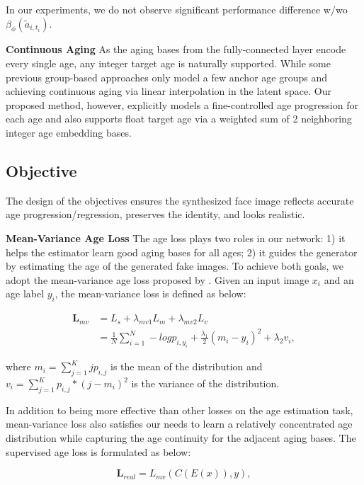 \documentclass[final]{cvpr}
\begin{document}
In our experiments, we do not observe significant performance difference w/wo \(\beta_\phi(\tilde{a}_{i,t_i})\).

\textbf{Continuous Aging}
As the aging bases from the fully-connected layer encode every single age, any integer target age is naturally supported. While some previous group-based approaches only model a few anchor age groups and achieving continuous aging via linear interpolation in the latent space. Our proposed method, however, explicitly models a fine-controlled age progression for each age and also supports float target age via a weighted sum of 2
neighboring integer age embedding bases.

\subsection{Objective}
The design of the objectives ensures the synthesized face image reflects accurate age progression/regression, preserves the identity, and looks realistic.

\textbf{Mean-Variance Age Loss}
The age loss plays two roles in our network: 1) it helps the estimator learn good aging bases for all ages; 2) it guides the generator by estimating the age of the generated fake images. To achieve both goals, we adopt the mean-variance age loss proposed by \cite{pan2018mean}. Given an input image \(x_i\) and an age label \(y_i\), the mean-variance loss is defined as below:

\begin{equation}
\begin{split}
\mathbf{L}_{mv} &= L_s + \lambda_{mv1} L_m + \lambda_{mv2} L_v \\ 
                                &= \frac{1}{N} \sum_{i=1}^{N} -log p_{i, y_i} + \frac{\lambda_1}{2} (m_i - y_i)^2 + \lambda_2 v_i,
\label{mean_variance_loss}
\end{split}
\end{equation}

where \(m_i = \sum_{j=1}^{K} jp_{i,j}\) is the mean of the distribution and \(v_i = \sum_{j=1}^{K} p_{i,j} * (j - m_i)^2\) is the variance of the distribution.


In addition to being more effective than other losses on the age estimation task, mean-variance loss also satisfies our needs to learn a relatively concentrated age distribution while capturing the age continuity for the adjacent aging bases.
The supervised age loss is formulated as below:

\begin{equation}
\mathbf{L}_{real} = L_{mv}(C(E(x)), y),
\label{real_age_loss}
\end{equation}
\end{document}
